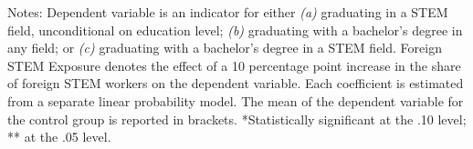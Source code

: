 \begin{table}[ht]
\begin{threeparttable}
\begin{tabular}{lcccc}
\bottomrule 
\end{tabular} 
\footnotesize Notes: Dependent variable is an indicator for either \emph{(a)} graduating in a STEM field, unconditional on education level; \emph{(b)} graduating with a bachelor's degree in any field; or \emph{(c)} graduating with a bachelor's degree in a STEM field. Foreign STEM Exposure denotes the effect of a 10 percentage point increase in the share of foreign STEM workers on the dependent variable. Each coefficient is estimated from a separate linear probability model. The mean of the dependent variable for the control group is reported in brackets. *Statistically significant at the .10 level; ** at the .05 level.
\end{threeparttable} 
\end{table} 
